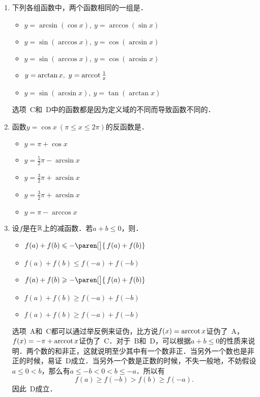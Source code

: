 \begin{enumerate}
\item 下列各组函数中，两个函数相同的一组是\uline{\makebox[6em]{}}．
  \begin{itemize}
    \renewcommand{\labelitemi}{\faCircleThin}
  \item \(y = \arcsin(\cos x),\ y = \arccos(\sin x)\)
    \ifshowsol
  \item[\faCircle] \(y = \sin(\arccos x),\ y = \cos(\arcsin x)\)
    \else
  \item \(y = \sin(\arccos x),\ y = \cos(\arcsin x)\)
    \fi
  \item \(y = \arctan x,\ y = \operatorname{arccot}\frac1x\)
  \item \(y = \sin(\arcsin x),\ y = \tan(\arctan x)\)
  \end{itemize}

  \ifshowsol
  选项~C和~D中的函数都是因为定义域的不同而导致函数不同的．
  \fi

\item 函数\(y = \cos x\ (\pi \le x \le 2\pi)\)的反函数是\uline{\makebox[6em]{}}．
  \begin{itemize}
    \renewcommand{\labelitemi}{\faCircleThin}
  \item \(y = \pi + \cos x\)
  \item \(y = \frac52\pi - \arcsin x\)
    \ifshowsol
  \item[\faCircle] \(y = \frac32\pi + \arcsin x\)
    \else
  \item \(y = \frac32\pi + \arcsin x\)
    \fi
  \item \(y = \pi - \arccos x\)
  \end{itemize}

\item 设\(f\)是在\(\mathbb{R}\)上的减函数．若\(a + b \le 0\)，则\uline{\makebox[6em]{}}．
  \begin{itemize}
    \renewcommand{\labelitemi}{\faCircleThin}
  \item \(f(a) + f(b) \le -\paren[\big]{\,f(a) + f(b)}\)
  \item \(f(a) + f(b) \le f(-a) + f(-b)\)
  \item \(f(a) + f(b) \ge -\paren[\big]{\,f(a) + f(b)}\)
    \ifshowsol
  \item[\faCircle] \(f(a) + f(b) \ge f(-a) + f(-b)\)
    \else
  \item \(f(a) + f(b) \ge f(-a) + f(-b)\)
    \fi
  \end{itemize}

  \ifshowsol
  选项~A和~C都可以通过举反例来证伪，比方说\(f(x) = \operatorname{arccot} x\)证伪了~A，\(f(x) = -\pi + \operatorname{arccot} x\)证伪了~C．对于~B和~D，可以根据\(a + b \le 0\)的性质来说明．两个数的和非正，这就说明至少其中有一个数非正．当另外一个数也是非正的时候，易证~D成立．当另外一个数是正数的时候，不失一般地，不妨假设\(a \le 0 < b\)，那么有\(a \le -b < 0 < b \le -a\)．所以有
  \[
    f(a) \ge f(-b) > f(b) \ge f(-a).
  \]
  因此~D成立．
  \fi


\end{enumerate}
